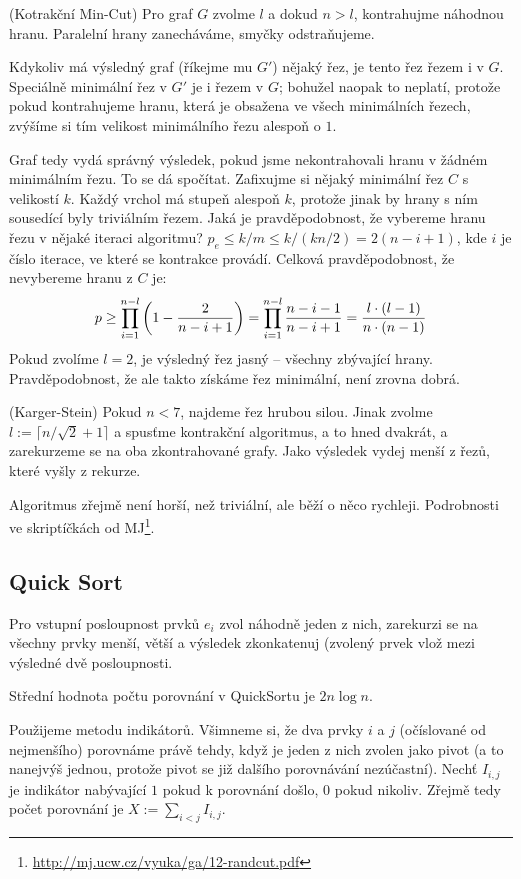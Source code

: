 \alg (Kotrakční Min-Cut) Pro graf $G$ zvolme $l$ a dokud $n > l$, kontrahujme
náhodnou hranu. Paralelní hrany zanecháváme, smyčky odstraňujeme.

Kdykoliv má výsledný graf (říkejme mu $G'$) nějaký řez, je tento řez řezem i v
$G$. Speciálně minimální řez v $G'$ je i řezem v $G$; bohužel naopak to neplatí,
protože pokud kontrahujeme hranu, která je obsažena ve všech minimálních řezech,
zvýšíme si tím velikost minimálního řezu alespoň o $1$.

Graf tedy vydá správný výsledek, pokud jsme nekontrahovali hranu v žádném
minimálním řezu. To se dá spočítat. Zafixujme si nějaký minimální řez $C$ s
velikostí $k$. Každý vrchol má stupeň alespoň $k$, protože jinak by hrany s ním
sousedící byly triviálním řezem. Jaká je pravděpodobnost, že vybereme hranu
řezu v nějaké iteraci algoritmu? $p_e \leq k/m \leq k/(kn/2) = 2(n-i+1)$, kde
$i$ je číslo iterace, ve které se kontrakce provádí. Celková pravděpodobnost, že
nevybereme hranu z $C$ je:
\begin{align}
	p \geq \prod_{i=1}^{n-l} \left( 1 - {2 \over n-i+1}\right) =
	\prod_{i=1}^{n-l}{n-i-1 \over n-i+1}
	= {l \cdot (l-1) \over n \cdot (n-1)}
\end{align}
Pokud zvolíme $l=2$, je výsledný řez jasný -- všechny zbývající hrany.
Pravděpodobnost, že ale takto získáme řez minimální, není zrovna dobrá.

\alg (Karger-Stein) Pokud $n < 7$, najdeme řez hrubou silou. Jinak zvolme $l :=
\lceil n/\sqrt 2 +1\rceil$ a spusťme kontrakční algoritmus, a to hned dvakrát, a
zarekurzeme se na oba zkontrahované grafy. Jako výsledek vydej menší z řezů,
které vyšly z rekurze.

Algoritmus zřejmě není horší, než triviální, ale běží o něco rychleji.
Podrobnosti ve skriptíčkách od
MJ\footnote{\url{http://mj.ucw.cz/vyuka/ga/12-randcut.pdf}}.

\subsection{Quick Sort}

\alg Pro vstupní posloupnost prvků $e_i$ zvol náhodně jeden z nich, zarekurzi se
na všechny prvky menší, větší a výsledek zkonkatenuj (zvolený prvek vlož mezi
výsledné dvě posloupnosti.

\vt Střední hodnota počtu porovnání v QuickSortu je $2n \log n$.

\dk Použijeme metodu indikátorů. Všimneme si, že dva prvky $i$ a $j$ (očíslované
od nejmenšího) porovnáme právě tehdy, když je jeden z nich zvolen jako pivot (a
to nanejvýš jednou, protože pivot se již dalšího porovnávání nezúčastní). Nechť
$I_{i,j}$ je indikátor nabývající $1$ pokud k porovnání došlo, $0$ pokud
nikoliv. Zřejmě tedy počet porovnání je $X := \sum_{i < j} I_{i,j}$.

